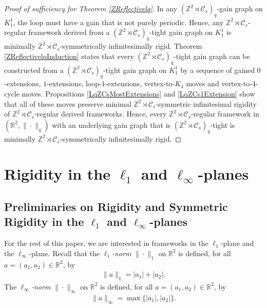 \documentclass[reqno,a4paper,10pt]{article}
\theoremstyle{definition}
\theoremstyle{remark}
\numberwithin{equation}{section}
\numberwithin{figure}{section}
\numberwithin{table}{section}
\newcommand{\R}{\mathbb{R}}
\newcommand{\Z}{\mathbb{Z}}
\begin{document}
    \begin{proof}[Proof of sufficiency for Theorem \ref{ZReflectivelq}]
        In any $(\Z^2\rtimes\mathcal{C}_s)_q$-gain graph on $K_1^1$, the loop must have a gain that is not purely periodic. Hence, any $\Z^2\rtimes\mathcal{C}_s$-regular framework derived from a $(\Z^2\rtimes\mathcal{C}_s)_q$-tight gain graph on $K_1^1$ is minimally $\Z^2\rtimes\mathcal{C}_s$-symmetrically infinitesimally rigid. Theorem \ref{ZReflectivelqInduction} states that every $(\Z^2\rtimes\mathcal{C}_s)_q$-tight gain graph can be constructed from a $(\Z^2\rtimes\mathcal{C}_s)_q$-tight gain graph on $K_1^1$ by a sequence of gained $0$-extensions, $1$-extensions, loop-$1$-extensions, vertex-to-$K_4$ moves and vertex-to-$4$-cycle moves. Propositions \ref{LqZCsMostExtensions} and \ref{LqZCs1Extension} show that all of these moves preserve minimal $\Z^2\rtimes\mathcal{C}_s$-symmetric infinitesimal rigidity of $\Z^2\rtimes\mathcal{C}_s$-regular derived frameworks. Hence, every $\Z^2\rtimes\mathcal{C}_s$-regular framework in $(\R^2,\|\cdot\|_q)$ with an underlying gain graph that is $(\Z^2\rtimes\mathcal{C}_s)_q$-tight is minimally $\Z^2\rtimes\mathcal{C}_s$-symmetrically infinitesimally rigid.
    \end{proof}

    \section{Rigidity in the $\ell_1$ and $\ell_\infty$-planes}

    \subsection{Preliminaries on Rigidity and Symmetric Rigidity in the $\ell_1$ and $\ell_\infty$-planes}\label{SectionPolytopicBasics}

    For the rest of this paper, we are interested in frameworks in the $\ell_1$-plane and the $\ell_\infty$-plane. Recall that the \emph{$\ell_1$-norm} $\|\cdot\|_1$ on $\R^2$ is defined, for all $a=(a_1,a_2)\in\R^2$, by
    \begin{align*}
        \|a\|_1=|a_1|+|a_2|.
    \end{align*}
    The \emph{$\ell_\infty$-norm} $\|\cdot\|_\infty$ on $\R^2$ is defined, for all $a=(a_1,a_2)\in\R^2$, by
    \begin{align*}
        \|a\|_\infty=\max\{|a_1|,|a_2|\}.
    \end{align*}
    
\end{document}
